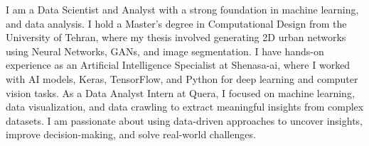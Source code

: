 

\begin{cvparagraph}
	I am a Data Scientist and Analyst with a strong foundation in machine learning, and data analysis. I hold a Master's degree in Computational Design from the University of Tehran, where my thesis involved generating 2D urban networks using Neural Networks, GANs, and image segmentation. I have hands-on experience as an Artificial Intelligence Specialist at Shenasa-ai, where I worked with AI models, Keras, TensorFlow, and Python for deep learning and computer vision tasks. As a Data Analyst Intern at Quera, I focused on machine learning, data visualization, and data crawling to extract meaningful insights from complex datasets. I am passionate about using data-driven approaches to uncover insights, improve decision-making, and solve real-world challenges.
	
	\vspace{5mm}
	
\end{cvparagraph}
